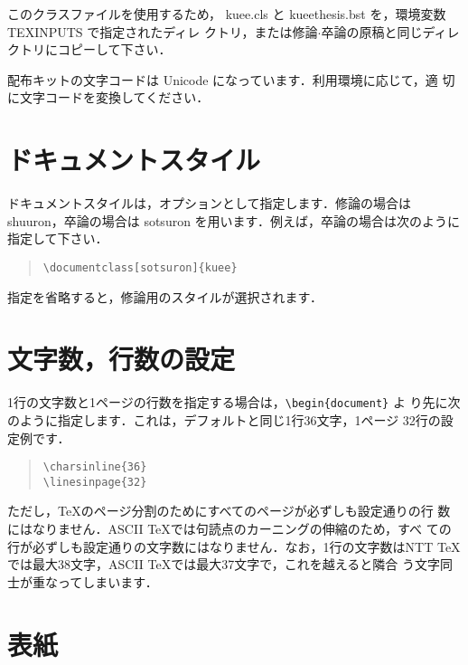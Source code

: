 \documentclass[
  sotsuron]{kuee}
\begin{document}
このクラスファイルを使用するため， kuee.cls と kueethesis.bst
を，環境変数 TEXINPUTS で指定されたディレ
クトリ，または修論\(\cdot\)卒論の原稿と同じディレクトリにコピーして下さい．

配布キットの文字コードは Unicode になっています．利用環境に応じて，適
切に文字コードを変換してください．

\hypertarget{ux30c9ux30adux30e5ux30e1ux30f3ux30c8ux30b9ux30bfux30a4ux30eb}{%
\section{ドキュメントスタイル}\label{ux30c9ux30adux30e5ux30e1ux30f3ux30c8ux30b9ux30bfux30a4ux30eb}}

ドキュメントスタイルは，オプションとして指定します．修論の場合は
shuuron，卒論の場合は sotsuron
を用います．例えば，卒論の場合は次のように指定して下さい．

\begin{quote}
  \begin{verbatim}
\documentclass[sotsuron]{kuee}
\end{verbatim}
\end{quote}

指定を省略すると，修論用のスタイルが選択されます．

\hypertarget{ux6587ux5b57ux6570ux884cux6570ux306eux8a2dux5b9a}{%
\section{文字数，行数の設定}\label{ux6587ux5b57ux6570ux884cux6570ux306eux8a2dux5b9a}}

1行の文字数と1ページの行数を指定する場合は，\verb+\begin{document}+ よ
り先に次のように指定します．これは，デフォルトと同じ1行36文字，1ページ
32行の設定例です．

\begin{quote}
  \begin{verbatim}
\charsinline{36}
\linesinpage{32}
\end{verbatim}
\end{quote}

ただし，\TeX のページ分割のためにすべてのページが必ずしも設定通りの行
数にはなりません．ASCII \TeX では句読点のカーニングの伸縮のため，すべ
ての行が必ずしも設定通りの文字数にはなりません．なお，1行の文字数はNTT
\TeX では最大38文字，ASCII \TeX では最大37文字で，これを越えると隣合
う文字同士が重なってしまいます．

\hypertarget{ux8868ux7d19}{%
\section{表紙}\label{ux8868ux7d19}}
\end{document}
